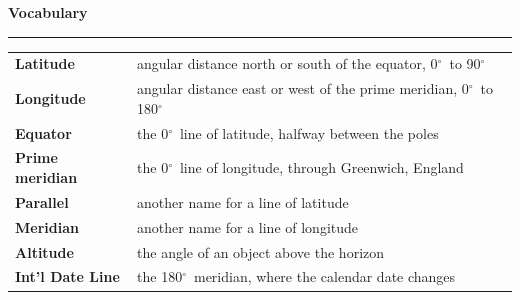 \documentclass[11pt,addpoints]{exam}
\newcommand{\dg}{\ensuremath{^{\circ}}}
\newcommand{\sectiontitle}[1]{%
  \needspace{6\baselineskip}%
  \vspace{0.6\baselineskip}%
  \noindent\textbf{\large #1}\par\nopagebreak
  \vspace{-0.4\baselineskip}\noindent\rule{\linewidth}{0.8pt}\par\nopagebreak
  \vspace{0.2\baselineskip}}
\begin{document}
\sectiontitle{Vocabulary}

\noindent\begin{tabular}{@{}p{1.5in}p{4.9in}@{}}
\textbf{Latitude} & angular distance north or south of the equator, 0\dg\ to 90\dg \\
\textbf{Longitude} & angular distance east or west of the prime meridian, 0\dg\ to 180\dg \\
\textbf{Equator} & the 0\dg\ line of latitude, halfway between the poles \\
\textbf{Prime meridian} & the 0\dg\ line of longitude, through Greenwich, England \\
\textbf{Parallel} & another name for a line of latitude \\
\textbf{Meridian} & another name for a line of longitude \\
\textbf{Altitude} & the angle of an object above the horizon \\
\textbf{Int'l Date Line} & the 180\dg\ meridian, where the calendar date changes \\
\end{tabular}
\end{document}
